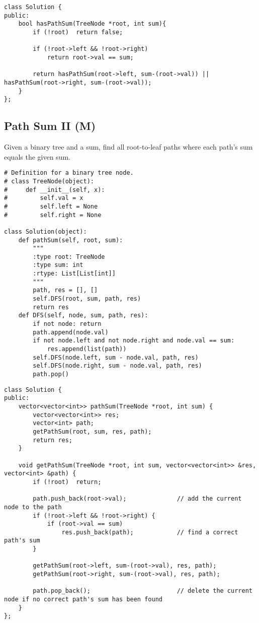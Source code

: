 \begin{lstlisting}
class Solution {
public:
    bool hasPathSum(TreeNode *root, int sum){
        if (!root)  return false;
        
        if (!root->left && !root->right)
            return root->val == sum;
            
        return hasPathSum(root->left, sum-(root->val)) || hasPathSum(root->right, sum-(root->val));
    }
};
\end{lstlisting}


\subsection{Path Sum II (M)}
Given a binary tree and a sum, find all root-to-leaf paths where each path's sum equals the given sum. \\

\begin{lstlisting}
# Definition for a binary tree node.
# class TreeNode(object):
#     def __init__(self, x):
#         self.val = x
#         self.left = None
#         self.right = None

class Solution(object):
    def pathSum(self, root, sum):
        """
        :type root: TreeNode
        :type sum: int
        :rtype: List[List[int]]
        """
        path, res = [], []
        self.DFS(root, sum, path, res)
        return res
    def DFS(self, node, sum, path, res):
        if not node: return
        path.append(node.val)
        if not node.left and not node.right and node.val == sum:
            res.append(list(path))
        self.DFS(node.left, sum - node.val, path, res)
        self.DFS(node.right, sum - node.val, path, res)
        path.pop()
\end{lstlisting}
 
\begin{lstlisting}
class Solution {
public:
    vector<vector<int>> pathSum(TreeNode *root, int sum) {
        vector<vector<int>> res;
        vector<int> path;
        getPathSum(root, sum, res, path);
        return res;
    }
    
    void getPathSum(TreeNode *root, int sum, vector<vector<int>> &res, vector<int> &path) {
        if (!root)  return;
        
        path.push_back(root->val);              // add the current node to the path
        if (!root->left && !root->right) {
            if (root->val == sum)
                res.push_back(path);            // find a correct path's sum
        }
        
        getPathSum(root->left, sum-(root->val), res, path);
        getPathSum(root->right, sum-(root->val), res, path);

        path.pop_back();                        // delete the current node if no correct path's sum has been found
    }
};
\end{lstlisting}

